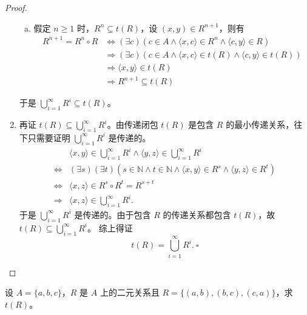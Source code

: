 \documentclass[normal,cyan]{elegantnote}
\newcommand{\QED}{\square}
\begin{document}
\begin{proof}
\begin{enumerate}
\begin{enumerate}[a)]
            \item 假定 $n \geq 1$ 时，$R^n \subseteq t(R)$，设 $(x, y) \in R^{n+1}$，则有 $$\begin{aligned}
                R^{n+1}=R^{n} \circ R & \Leftrightarrow(\exists c)\left(c \in A \wedge\langle x, c\rangle \in R^{n} \wedge\langle c, y\rangle \in R\right) \\
                & \Rightarrow(\exists c)(c \in A \wedge\langle x, c\rangle \in t(R) \wedge\langle c, y\rangle \in t(R)) \\
                & \Rightarrow\langle x, y\rangle \in t(R) \\
                & \Rightarrow R^{n+1} \subseteq t(R)
                \end{aligned}$$
        \end{enumerate}
        于是 $\bigcup\limits_{i = 1}^{\infty}R^i \subseteq t(R)$。
        \item 再证 $t(R) \subseteq \bigcup\limits_{i = 1}^{\infty}R^i$。由传递闭包 $t(R)$ 是包含 $R$ 的最小传递关系，往下只需要证明 $\bigcup\limits_{i = 1}^{\infty}R^i$ 是传递的。$$\begin{aligned}
            &\langle x, y\rangle \in \bigcup_{i=1}^{\infty} R^{i} \wedge\langle y, z\rangle \in \bigcup_{i=1}^{\infty} R^{i} \\
            \Leftrightarrow &(\exists s)(\exists t)\left(s \in \mathbb{N} \wedge t \in \mathbb{N} \wedge\langle x, y\rangle \in R^{s} \wedge\langle y, z\rangle \in R^{t}\right) \\
            \Leftrightarrow &\langle x, z\rangle \in R^{s} \circ R^{t}=R^{s+t} \\
            \Rightarrow &\langle x, z\rangle \in \bigcup_{i=1}^{\infty} R^{i} .
            \end{aligned}$$
        于是 $\bigcup\limits_{i = 1}^{\infty}R^i$ 是传递的。由于包含 $R$ 的传递关系都包含 $t(R)$，故 $t(R) \subseteq \bigcup\limits_{i = 1}^{\infty}R^i$。
        综上得证 $$t(R) = \bigcup\limits_{i = 1}^{\infty}R^i.\ \QED$$
    \end{enumerate}
\end{proof}
\begin{example}
    设 $A = \{a, b, c\}$，$R$ 是 $A$ 上的二元关系且 $R = \{(a, b), (b, c), (c, a)\}$，求 $t(R)$。
\end{example}
\end{document}
